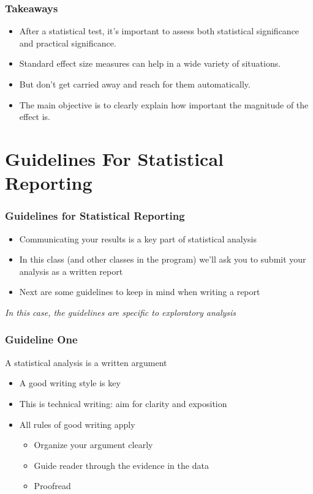 \documentclass[12pt, block=fill]{beamer}
\begin{document}
\begin{frame}
  \frametitle{Takeaways}
  \begin{itemize}
  \item  After a statistical test, it's important to assess both
    statistical significance and practical significance.
  \item Standard effect size measures can help in a wide variety of situations.
  \item But don't get carried away and reach for them automatically.
  \item The main objective is to clearly explain how important the
    magnitude of the effect is.
  \end{itemize}
\end{frame}

\section{Guidelines For Statistical Reporting}

\begin{frame}
  \frametitle{Guidelines for Statistical Reporting}
  \begin{itemize}
    \item Communicating your results is a key part of statistical analysis
    \item In this class (and other classes in the program) we'll ask you to submit your analysis as a written report
    \item Next are some guidelines to keep in mind when writing a report
  \end{itemize}
 
  \textit{In this case, the guidelines are specific to exploratory analysis}
\end{frame}

\begin{frame}
  \frametitle{Guideline One}
    \begin{exampleblock}{A statistical analysis is a written argument}
      \begin{itemize}
        \item A good writing style is key
        \item This is technical writing: aim for clarity and exposition
        \item All rules of good writing apply
        \begin{itemize}
          \item Organize your argument clearly
          \item Guide reader through the evidence in the data
          \item Proofread
        \end{itemize}
      \end{itemize}
    \end{exampleblock}
\end{frame}
\end{document}
